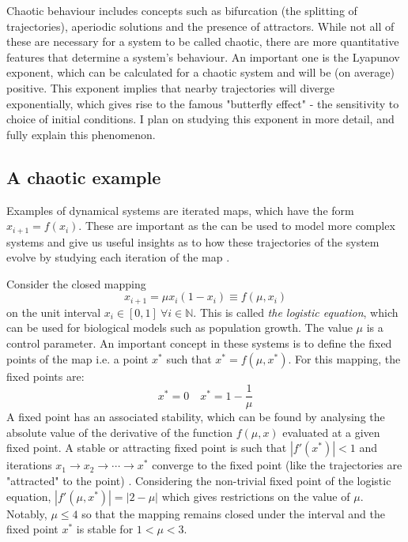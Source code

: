 \documentclass[12pt,a4paper]{amsart}
\begin{document}

Chaotic behaviour includes concepts such as bifurcation (the splitting of trajectories), aperiodic solutions and the presence of attractors. While not all of these are necessary for a system to be called chaotic, there are more quantitative features that determine a system's behaviour. An important one is the Lyapunov exponent, which can be calculated for a chaotic system and will be (on average) positive. This exponent implies that nearby trajectories will diverge exponentially, which gives rise to the famous "butterfly effect" - the sensitivity to choice of initial conditions. I plan on studying this exponent in more detail, and fully explain this phenomenon.

\subsection{A chaotic example}

Examples of dynamical systems are iterated maps, which have the form $x_{i+1} = f(x_{i})$. These are important as the can be used to model more complex systems and give us useful insights as to how these trajectories of the system evolve by studying each iteration of the map \cite{HILBORN}.

Consider the closed mapping $$x_{i+1} = {\mu} x_{i} (1 - x_{i}) \equiv f(\mu, x_{i}) \label{mapping}$$ on the unit interval $x_{i} \in [0, 1] \  {\forall}i \in \mathbb{N}$. This is called \textit{the logistic equation}, which can be used for biological models such as population growth. The value $\mu$ is a control parameter. An important concept in these systems is to define the fixed points of the map i.e. a point $x^{*}$ such that $x^{*} = f(\mu, x^{*})$. For this mapping, the fixed points are: $$x^{*} = 0 \quad x^{*} = 1 - \frac{1}{\mu}$$ A fixed point has an associated stability, which can be found by analysing the absolute value of the derivative of the function $f(\mu, x)$ evaluated at a given fixed point. A stable or attracting fixed point is such that $|f'(x^{*})| < 1$ and iterations $x_{1} \rightarrow x_{2} \rightarrow \cdots \rightarrow x^{*}$ converge to the fixed point (like the trajectories are "attracted" to the point) \cite{SCHECK}. Considering the non-trivial fixed point of the logistic equation, $|f'(\mu, x^{*})| = |2 - \mu|$ which gives restrictions on the value of $\mu$. Notably, $\mu \leq 4$ so that the mapping remains closed under the interval and the fixed point $x^{*}$ is stable for $1 < \mu < 3$. 
\end{document}
